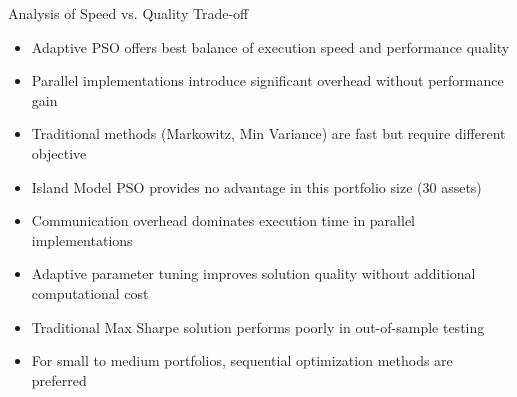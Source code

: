 \documentclass[aspectratio=169,xcolor=table]{beamer}
\begin{document}
\begin{frame}{Analysis of Speed vs. Quality Trade-off}
  \begin{tcolorbox}[
    enhanced,
    colback=blue!5,
    colframe=blue!70,
    arc=2mm,
    title=Analysis,
    fonttitle=\bfseries\large,
    boxrule=0.5mm
  ]
    \begin{itemize}
      \item Adaptive PSO offers best balance of execution speed and performance quality
      \item Parallel implementations introduce significant overhead without performance gain
      \item Traditional methods (Markowitz, Min Variance) are fast but require different objective
      \item Island Model PSO provides no advantage in this portfolio size (30 assets)
    \end{itemize}
  \end{tcolorbox}
  
  \begin{tcolorbox}[
    enhanced,
    colback=green!5,
    colframe=green!70,
    arc=2mm,
    title=Key Insights,
    fonttitle=\bfseries\large,
    boxrule=0.5mm
  ]
    \begin{itemize}
      \item Communication overhead dominates execution time in parallel implementations
      \item Adaptive parameter tuning improves solution quality without additional computational cost
      \item Traditional Max Sharpe solution performs poorly in out-of-sample testing
      \item For small to medium portfolios, sequential optimization methods are preferred
    \end{itemize}
  \end{tcolorbox}
\end{frame}
\end{document}
